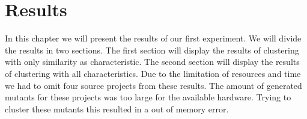 \documentclass[../main]{subfiles}
\begin{document}
\clearpage
\section{Results}
\label{ch:results_rq1}
In this chapter we will present the results of our first experiment.
We will divide the results in two sections. 
The first section will display the results of clustering with only similarity as characteristic.
The second section will display the results of clustering with all characteristics.
\newline
Due to the limitation of resources and time we had to omit four source projects from these results. 
The amount of generated mutants for these projects was too large for the available hardware.
Trying to cluster these mutants this resulted in a out of memory error.
\end{document}
